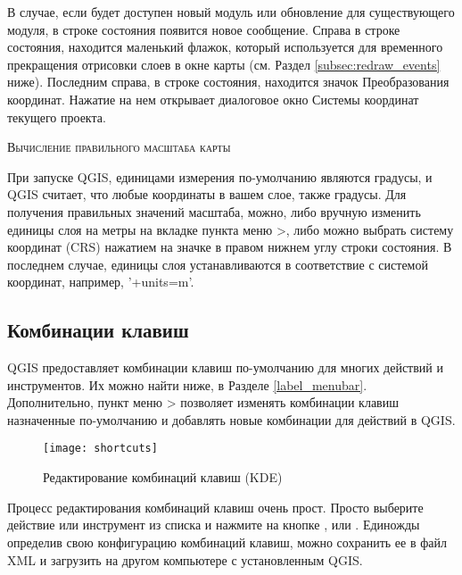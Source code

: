 В случае, если будет доступен новый модуль или обновление для существующего модуля, в строке состояния появится новое сообщение. Справа в строке состояния, находится маленький флажок, который используется для временного прекращения отрисовки слоев в окне карты (см. Раздел \ref{subsec:redraw_events} ниже). Последним справа, в строке состояния, находится значок Преобразования координат. Нажатие на нем открывает диалоговое окно Системы координат текущего проекта.

\begin{Tip}\caption{\textsc{Вычисление правильного масштаба карты}}
При запуске QGIS, единицами измерения по-умолчанию являются градусы, и QGIS считает, что любые
координаты в вашем слое, также градусы. Для получения правильных значений масштаба, можно, либо вручную изменить единицы слоя на метры на вкладке  пункта меню  >, либо можно выбрать систему координат (CRS) нажатием на значке
 в правом нижнем углу строки
состояния. В последнем случае, единицы слоя устанавливаются в соответствие с системой координат, например, '+units=m'.
\end{Tip}

\subsection{Комбинации клавиш}\label{shortcuts}

QGIS предоставляет комбинации клавиш по-умолчанию для многих действий и инструментов. Их можно найти ниже, в Разделе \ref{label_menubar}. Дополнительно, пункт меню  >
 позволяет изменять комбинации клавиш назначенные по-умолчанию и добавлять новые комбинации для действий в QGIS.

\begin{figure}[ht]
   \centering
   \texttt{[image: shortcuts]}
   \caption{Редактирование комбинаций клавиш \nixcaption (KDE)} \label{fig:shortcuts}
\end{figure}

Процесс редактирования комбинаций клавиш очень прост. Просто выберите действие или инструмент из списка и нажмите на кнопке ,  или . Единожды определив свою конфигурацию комбинаций клавиш, можно сохранить ее в файл XML и загрузить на другом компьютере с установленным QGIS.

